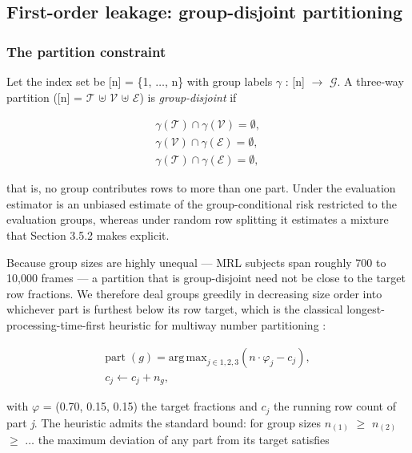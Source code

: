 \FloatBarrier

\subsection{First-order leakage: group-disjoint partitioning}

\subsubsection{The partition constraint}

Let the index set be [n] = \{1, $\dots$, n\} with group labels $\gamma$ : [n] $\to$ $\mathcal{G}$. A three-way partition ([n] = $\mathcal{T}$ $\uplus$ $\mathcal{V}$ $\uplus$ $\mathcal{E}$) is \emph{group-disjoint} if

\begin{equation}
\label{eq:35}
\begin{aligned}
\gamma (\mathcal{T}) \cap \gamma (\mathcal{V}) = \emptyset , \\
\gamma (\mathcal{V}) \cap \gamma (\mathcal{E}) = \emptyset , \\
\gamma (\mathcal{T}) \cap \gamma (\mathcal{E}) = \emptyset ,
\end{aligned}
\end{equation}

that is, no group contributes rows to more than one part. Under  the evaluation estimator  is an unbiased estimate of the group-conditional risk  restricted to the evaluation groups, whereas under random row splitting it estimates a mixture that Section 3.5.2 makes explicit.

Because group sizes are highly unequal --- MRL subjects span roughly 700 to 10,000 frames --- a partition that is group-disjoint need not be close to the target row fractions. We therefore deal groups greedily in decreasing size order into whichever part is furthest below its row target, which is the classical longest-processing-time-first heuristic for multiway number partitioning :

\begin{equation}
\label{eq:36}
\begin{aligned}
\text{part}\;(g) = \mathrm{arg\,\mathrm{max}}_{j \in {1,2,3}} ( n \cdot \varphi _j - c_j ), \\
c_j \leftarrow c_j + n_g ,
\end{aligned}
\end{equation}

with $\varphi$ = (0.70, 0.15, 0.15) the target fractions and $c_{j}$ the running row count of part \emph{j}. The heuristic admits the standard bound: for group sizes $n_{(1)}$ $\geq$ $n_{(2)}$ $\geq$ $\dots$ the maximum deviation of any part from its target satisfies

